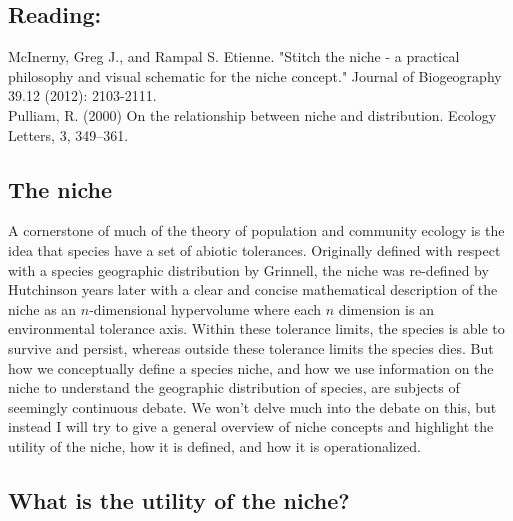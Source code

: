 \documentclass[12pt]{article}
\begin{document}
\subsection*{Reading:}

McInerny, Greg J., and Rampal S. Etienne. "Stitch the niche - a practical philosophy and visual schematic for the niche concept." Journal of Biogeography 39.12 (2012): 2103-2111.\\


Pulliam, R. (2000) On the relationship between niche and distribution. Ecology Letters, 3, 349–361.










\begin{center}
\noindent\hrulefill 
\end{center}



\clearpage


\subsection*{The niche}

A cornerstone of much of the theory of population and community ecology is the idea that species have a set of abiotic tolerances. Originally defined with respect with a species geographic distribution by Grinnell, the niche was re-defined by Hutchinson years later with a clear and concise mathematical description of the niche as an $n$-dimensional hypervolume where each $n$ dimension is an environmental tolerance axis. Within these tolerance limits, the species is able to survive and persist, whereas outside these tolerance limits the species dies. But how we conceptually define a species niche, and how we use information on the niche to understand the geographic distribution of species, are subjects of seemingly continuous debate. We won't delve much into the debate on this, but instead I will try to give a general overview of niche concepts and highlight the utility of the niche, how it is defined, and how it is operationalized. 









\bigskip



\subsection*{What is the utility of the niche?}
\end{document}
